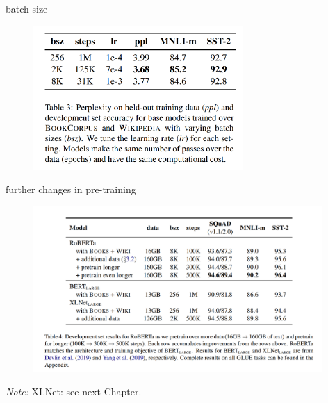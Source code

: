 
\begin{frame}{batch size}

\vfill

\begin{figure}
\centering
\includegraphics[width = 8cm]{figure/roberta-undertrained.png}\\ 
\end{figure}

\vfill

\end{frame}


\begin{frame}{further changes in pre-training}

\vfill

\begin{figure}
\centering
\includegraphics[width = 11cm]{figure/roberta-undertrained2.png}\\ 
\end{figure}

\vfill

\scriptsize
\textit{Note:} XLNet: see next Chapter.

\end{frame}

